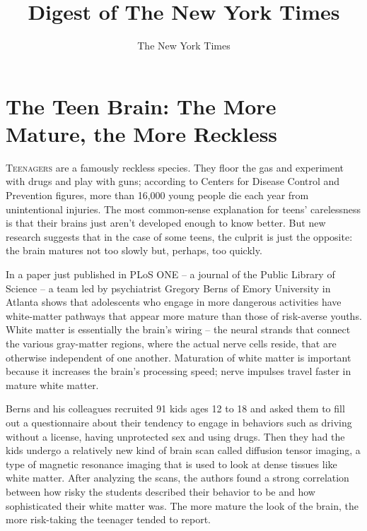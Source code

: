 ﻿\documentclass[12pt]{article}
\title{Digest of The New York Times}
\author{The New York Times}
\begin{document}
\date{}
\thispagestyle{empty}
\renewcommand\contentsname{\textsf{Digest of The New York Times}}
{\footnotesize\textsf{\tableofcontents}}
\clearpage
\setcounter{page}{1}

\section{The Teen Brain: The More Mature, the More Reckless}

\lettrine{T}{eenagers} are a famously reckless species. They floor the gas and experiment with drugs
and play with guns; according to Centers for Disease Control and Prevention figures, more than
16,000 young people die each year from unintentional injuries. The most common-sense explanation for
teens' carelessness is that their brains just aren't developed enough to know better. But new
research suggests that in the case of some teens, the culprit is just the opposite: the brain
matures not too slowly but, perhaps, too quickly.

In a paper just published in PLoS ONE -- a journal of the Public Library of Science -- a team led by
psychiatrist Gregory Berns of Emory University in Atlanta shows that adolescents who engage in more
dangerous activities have white-matter pathways that appear more mature than those of risk-averse
youths. White matter is essentially the brain's wiring -- the neural strands that connect the
various gray-matter regions, where the actual nerve cells reside, that are otherwise independent of
one another. Maturation of white matter is important because it increases the brain's processing
speed; nerve impulses travel faster in mature white matter. 

Berns and his colleagues recruited 91 kids ages 12 to 18 and asked them to fill out a questionnaire
about their tendency to engage in behaviors such as driving without a license, having unprotected
sex and using drugs. Then they had the kids undergo a relatively new kind of brain scan called
diffusion tensor imaging, a type of magnetic resonance imaging that is used to look at dense tissues
like white matter. After analyzing the scans, the authors found a strong correlation between how
risky the students described their behavior to be and how sophisticated their white matter was. The
more mature the look of the brain, the more risk-taking the teenager tended to report.
\end{document}
